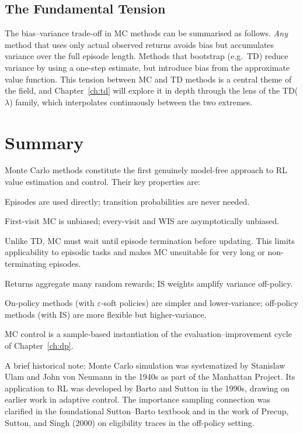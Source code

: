 \subsection*{The Fundamental Tension}

The bias--variance trade-off in MC methods can be summarised as follows.  \emph{Any} method that uses only actual observed returns avoids bias but accumulates variance over the full episode length.  Methods that bootstrap (e.g.\ TD) reduce variance by using a one-step estimate, but introduce bias from the approximate value function.  This tension between MC and TD methods is a central theme of the field, and Chapter~\ref{ch:td} will explore it in depth through the lens of the TD($\lambda$) family, which interpolates continuously between the two extremes.


\section{Summary}
\label{sec:mc-summary}

Monte Carlo methods constitute the first genuinely model-free approach to RL value estimation and control.  Their key properties are:

\begin{description}[leftmargin=!, labelwidth=3.5cm]
  \item[No model required.]  Episodes are used directly; transition probabilities are never needed.
  \item[Unbiased estimates.]  First-visit MC is unbiased; every-visit and WIS are asymptotically unbiased.
  \item[Complete episodes.]  Unlike TD, MC must wait until episode termination before updating.  This limits applicability to episodic tasks and makes MC unsuitable for very long or non-terminating episodes.
  \item[High variance.]  Returns aggregate many random rewards; IS weights amplify variance off-policy.
  \item[On/off-policy split.]  On-policy methods (with $\varepsilon$-soft policies) are simpler and lower-variance; off-policy methods (with IS) are more flexible but higher-variance.
  \item[GPI framework.]  MC control is a sample-based instantiation of the evaluation--improvement cycle of Chapter~\ref{ch:dp}.
\end{description}

A brief historical note: Monte Carlo simulation was systematized by Stanislaw Ulam and John von Neumann in the 1940s as part of the Manhattan Project.  Its application to RL was developed by Barto and Sutton in the 1990s, drawing on earlier work in adaptive control.  The importance sampling connection was clarified in the foundational Sutton--Barto textbook and in the work of Precup, Sutton, and Singh (2000) on eligibility traces in the off-policy setting.

